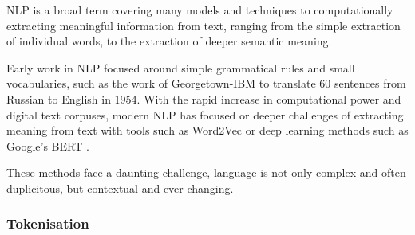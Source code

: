 NLP is a broad term covering many models and techniques to computationally extracting meaningful information from text, ranging from the simple extraction of individual words, to the extraction of deeper semantic meaning. 

Early work in NLP focused around simple grammatical rules and small vocabularies, such as the work of Georgetown-IBM  to translate 60 sentences from Russian to English in 1954. With the rapid increase in computational power and digital text corpuses, modern NLP has focused or deeper challenges of extracting meaning from text with tools such as Word2Vec  or deep learning methods such as Google's BERT .

These methods face a daunting challenge, language is not only complex and often duplicitous, but contextual and ever-changing. 

\subsubsection{Tokenisation} 




